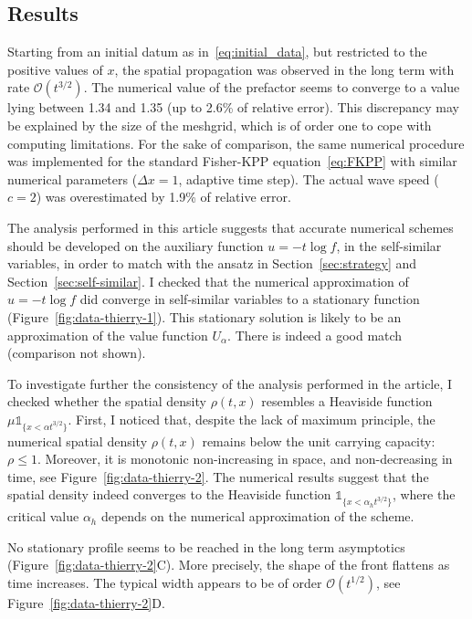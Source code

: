 \documentclass[10pt]{amsart}
\theoremstyle{definition}\newtheorem{defi}[theo]{Definition}\newtheorem{rema}[theo]{Remark}\newtheorem{exam}[theo]{Example}\newtheorem{exem}[theo]{Example}\newtheorem{nota}[theo]{Notation}
\newcommand{\mO}{\mathcal{O}}
\newcommand{\1}{\mathds{1}}
\begin{document}
\subsection{Results}
Starting from an initial datum as in~\eqref{eq:initial_data}, but restricted to the positive values of $x$, the spatial propagation was observed in the long term with rate $\mO(t^{3/2})$. The numerical value of the prefactor seems to converge to a value lying between 1.34 and 1.35 (up to 2.6\% of relative error).
This discrepancy may be explained by the size of the meshgrid, which is of order one to cope with computing limitations.
For the sake of comparison, the same numerical procedure was implemented for the standard Fisher-KPP equation~\eqref{eq:FKPP} with similar numerical parameters ($\Delta x = 1$, adaptive time step). The actual wave speed ($c=2$) was overestimated by 1.9\% of relative error.

The analysis performed in this article suggests that accurate numerical schemes should be developed on the auxiliary function $u = -t\log f$, in the self-similar variables, in order to match with the ansatz in Section~\ref{sec:strategy} and Section~\ref{sec:self-similar}. I checked that the numerical approximation of $u = -t\log f$ did converge in self-similar variables to a stationary function (Figure~\ref{fig:data-thierry-1}). This stationary solution is likely to be an approximation of the value function $U_{\alpha}$. There is indeed a good match (comparison not shown).

To investigate further the consistency of the analysis performed in the article, I checked whether the spatial density $\rho(t,x)$ resembles a Heaviside function $\mu \1_{\{x < \alpha t^{3/2}\}}$. First, I noticed that, despite the lack of maximum principle, the numerical spatial density $\rho(t,x)$ remains below the unit carrying capacity: $\rho\leq 1$. Moreover, it is monotonic non-increasing in space, and non-decreasing in time, see Figure~\ref{fig:data-thierry-2}. The numerical results suggest that the spatial density indeed converges to the Heaviside function $\1_{\{ x < \alpha_h t^{3/2}\}}$, where the critical value $\alpha_h$ depends on the numerical approximation of the scheme.

No stationary profile seems to be reached in the long term asymptotics (Figure~\ref{fig:data-thierry-2}C). More precisely, the shape of the front flattens as time increases. The typical width appears to be of order $\mO(t^{1/2})$, see Figure~\ref{fig:data-thierry-2}D.
\end{document}
